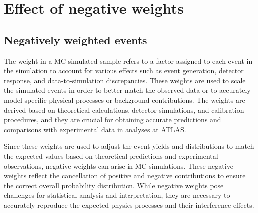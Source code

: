 \begin{comment}
%
%
asdf
\end{comment}

\chapter{Effect of negative weights}
\label{chap:Appendix:NegWeights}



\section{Negatively weighted events}
\label{chap:Appendix:NegWeights:intro}

The weight in a MC simulated sample refers to a factor assigned to each 
event in the simulation to account for various effects such as event generation, 
detector response, and data-to-simulation discrepancies. These weights are used 
to scale the simulated events in order to better match the observed data or to accurately 
model specific physical processes or background contributions. The weights 
are derived based on theoretical calculations, detector simulations, and calibration 
procedures, and they are crucial for obtaining accurate predictions and comparisons 
with experimental data in analyses at ATLAS.

Since these weights are used to adjust the event yields and distributions to match the
expected values based on theoretical predictions and experimental observations, 
negative weights can arise in MC simulations. These negative weights reflect the cancellation 
of positive and negative contributions to ensure the correct overall probability distribution. While 
negative weights pose challenges for statistical analysis and interpretation, they are necessary 
to accurately reproduce the expected physics processes and their interference effects. 


